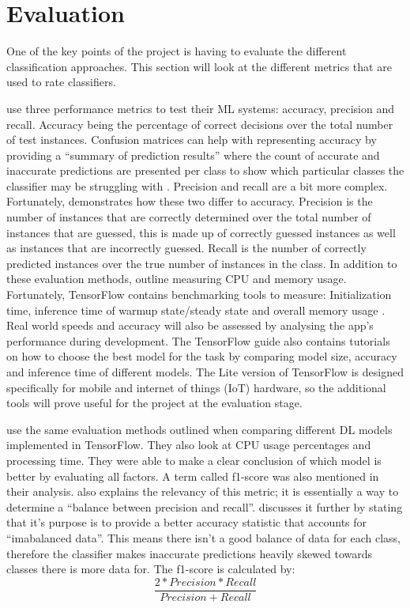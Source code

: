 \documentclass[12pt,a4paper]{report}
\begin{document}
\section{Evaluation}
\label{subsec:evaluation}

One of the key points of the project is having to evaluate the different classification approaches. This section will
look at the different metrics that are used to rate classifiers.

\par

\citet{10.1145/1163593.1163596} use three performance metrics to test their ML systems: accuracy, precision and recall. 
Accuracy 
being the percentage of correct decisions over the total number of test instances. Confusion matrices can help with 
representing accuracy by providing a “summary of prediction results” where the count of accurate and inaccurate 
predictions are presented per class to show which particular classes the classifier may be struggling with \citep{Brownlee2020b}. 
Precision and recall are a bit more complex. 
Fortunately, \citet{shung2018} demonstrates how these two differ to accuracy. Precision is the number of 
instances that are correctly determined over the total number of instances that are guessed, this is made up of 
correctly guessed instances as well as instances that are incorrectly guessed. Recall is the number of correctly 
predicted instances over the true number of instances in the class. In addition to these evaluation methods, 
\citet{10.1145/1163593.1163596} outline measuring CPU and memory usage. Fortunately, TensorFlow
contains benchmarking tools to measure: Initialization time, inference time of warmup state/steady state and overall 
memory usage \citep{googleTF}. Real world speeds and accuracy will also be assessed by analysing the app's performance 
during development. The TensorFlow guide also contains tutorials on 
how to choose the best model for the task by comparing model size, accuracy and inference time of different models.
The Lite version of TensorFlow is designed specifically for mobile and internet of things (IoT) 
hardware, so the additional tools will prove useful for the project at the evaluation stage.

\par

\citet{Chockwanich} use the same evaluation methods outlined when comparing different DL models 
implemented in TensorFlow. They also look at CPU usage percentages and processing time. They were able to make a clear 
conclusion of which model is better by evaluating all factors. A term called f1-score was also mentioned in their 
analysis. \citet{shung2018} also explains the relevancy of this metric; it is essentially a way to determine a “balance between
precision and recall”. \citet{kors2021} discusses it further by stating that it's purpose is to provide a better 
accuracy statistic that accounts for “imabalanced data”. This means there isn't a good balance of data for each 
class, therefore the classifier makes inaccurate predictions heavily skewed towards classes there is more data for. 
The f1-score is calculated by:
\[\frac{2*Precision*Recall}{Precision + Recall}\]
\end{document}
